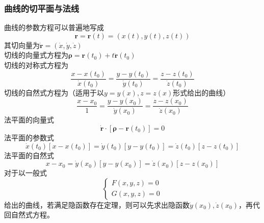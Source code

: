 \subsubsection{曲线的切平面与法线}
曲线的参数方程可以普遍地写成
\begin{equation}\label{key}
	\bm{r}=\bm{r}(t)=(x(t),y(t),z(t))
\end{equation}
其切向量为$ \dot{\bm{r}}=(\dot{x},\dot{y},\dot{z}) $\\
切线的向量式方程为$ \bm{\rho}=\bm{r}(t_0)+t\dot{\bm{r}}(t_0) $\\
切线的对称式方程为
\begin{equation}\label{key}
	\dfrac{x-x(t_0)}{\dot{x}(t_0)}=\dfrac{y-y(t_0)}{\dot{y}(t_0)}=\dfrac{z-z(t_0)}{\dot{z}(t_0)}
\end{equation}
切线的自然式方程为（适用于以$ y=y(x),z=z(x) $形式给出的曲线）
\begin{equation}\label{key}
	\dfrac{x-x_0}{1}=\dfrac{y-y(x_0)}{\dot{y}(x_0)}=\dfrac{z-z(x_0)}{\dot{z}(x_0)}
\end{equation}
法平面的向量式
\begin{equation}\label{key}
	 \dot{\bm{r}}\cdot [\bm{\rho}-\bm{r}(t_0)]=0
\end{equation}
法平面的参数式
\begin{equation}\label{key}
	\dot{x}(t_0)[x-x(t_0)]=\dot{y}(t_0)[y-y(t_0)]=\dot{z}(t_0)[z-z(t_0)]
\end{equation}
法平面的自然式
\begin{equation}\label{key}
	x-x_0=\dot{y}(x_0)[y-y(x_0)]=\dot{z}(x_0)[z-z(x_0)]
\end{equation}
对于以一般式
\begin{equation}\label{key}
	\begin{cases}
		F(x,y,z)=0\\
		G(x,y,z)=0
	\end{cases}
\end{equation}
给出的曲线，若满足隐函数存在定理，则可以先求出隐函数$ \dot{y}(x_0),\dot{z}(x_0) $，再代回自然式方程。
